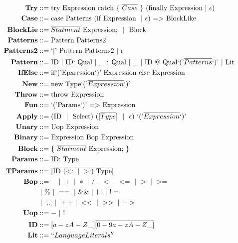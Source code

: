 \documentclass[12pt]{article}
\newcommand\bnf{\,\,|\,\,}
\renewcommand\c[1]{\text{#1}}
\begin{document}
\begin{align*}
  \textbf{Try} & :: = \c{try Expression catch \{}~\overline{Case} \c{ \} }
      (\c{finally Expression} \bnf \epsilon) \\
  \textbf{Case} & ::= \c{case Patterns (if Expression $\bnf \epsilon$) $=>$
        BlockLike} \\
  \textbf{BlockLie} & ::= \c{$\overline{Statment}$ Expression; $\bnf$ Block} \\
  \textbf{Patterns} & ::= \c{Pattern Patterns2} \\
  \textbf{Patterns2} & ::= \c{`$|$' Pattern Patterns2} \bnf \epsilon \\
  \textbf{Pattern} & ::= \c{ID} \bnf \c{ID: Qual} \bnf \c{\_ : Qual} \bnf
        \c{\_} \bnf \c{ID @ Qual`('$\overline{Patterns}$`)'} \bnf \c{Lit} \\
  \textbf{IfElse} & ::= \c{if`('Epxression`)' Expression else Expression} \\
  \textbf{New} & ::= \c{new Type`('$\overline{Expression}$`)'} \\
  \textbf{Throw} & ::= \c{throw Expression} \\
  \textbf{Fun} & ::= \c{`('Params`)' $=>$ Expression} \\
  \textbf{Apply} & ::= \c{(ID $\bnf$ Select) ([$\overline{Type}$] 
        $\bnf$ $\epsilon$) `('$\overline{Expression}$`)'} \\
  \textbf{Unary} & ::= \c{Uop Expression} \\
  \textbf{Binary} & ::= \c{Expression Bop Expression} \\
  \textbf{Block} & ::= \c{\{ $\overline{Statment}$ Expression; \}} \\
  \textbf{Params} & ::= \c{ID: Type} \\
  \textbf{TParams} & ::= [\overline{\c{ID}~(<: \bnf >:)~\c{Type}}] \\
  \textbf{Bop} & ::= - \bnf + \bnf * \bnf / \bnf < \bnf <= \bnf > \bnf >= \\
      & \bnf \% \bnf == \bnf \&\& \bnf \texttt{||} \bnf != \\
      & \bnf :: \bnf ++ \bnf << \bnf >> \bnf -> \\
  \textbf{Uop} & ::= - \bnf ! \\
  \textbf{ID} & ::= [a-zA-Z\_]\overline{[0-9a-zA-Z\_]} \\
  \textbf{Lit} & ::= ``Language Literals''
\end{align*}
\end{document}
